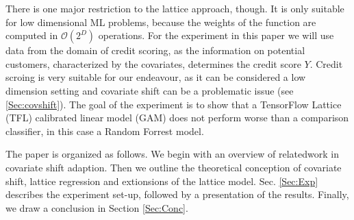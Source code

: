 There is one major restriction to the lattice approach, though. It is only suitable for low dimensional ML problems, because the weights of the function are computed in $\mathcal{O}(2^D)$ operations. For the experiment in this paper we will use data from the domain of credit scoring, as the information on potential customers, characterized by the covariates, determines the credit score $Y$. Credit scroing is very suitable for our endeavour, as it can be considered a low dimension setting \citep[Tab.~1]{lessmann2015benchmarking} and covariate shift can be a problematic issue (see \ref{Sec:covshift}). The goal of the experiment is to show that a TensorFlow Lattice (TFL) calibrated linear model (GAM) does not perform worse than a comparison classifier, in this case a Random Forrest model.

The paper is organized as follows. We begin with an overview of relatedwork in covariate shift adaption. Then we outline the theoretical conception of covariate shift, lattice regression and extionsions of the lattice model. Sec. \ref{Sec:Exp} describes the experiment set-up, followed by a presentation of the results. Finally, we draw a conclusion in  Section \ref{Sec:Conc}. 
		